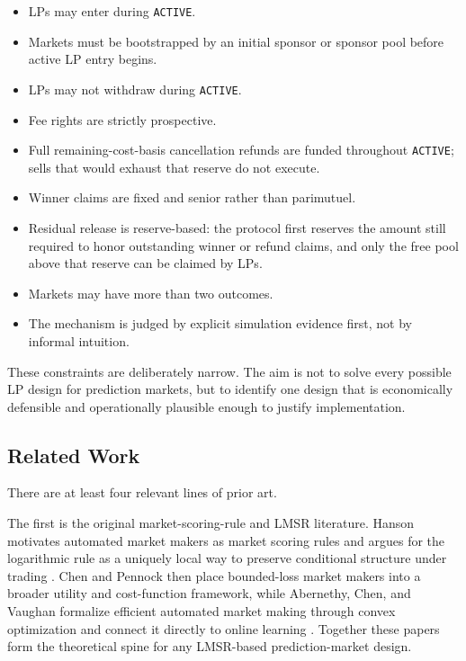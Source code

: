 \documentclass[10pt]{article}
\begin{document}
\begin{itemize}
\item LPs may enter during \texttt{ACTIVE}.
\item Markets must be bootstrapped by an initial sponsor or sponsor pool before active LP entry begins.
\item LPs may not withdraw during \texttt{ACTIVE}.
\item Fee rights are strictly prospective.
\item Full remaining-cost-basis cancellation refunds are funded throughout \texttt{ACTIVE}; sells that would exhaust that reserve do not execute.
\item Winner claims are fixed and senior rather than parimutuel.
\item Residual release is reserve-based: the protocol first reserves the amount still required to honor outstanding winner or refund claims, and only the free pool above that reserve can be claimed by LPs.
\item Markets may have more than two outcomes.
\item The mechanism is judged by explicit simulation evidence first, not by informal intuition.
\end{itemize}

These constraints are deliberately narrow. The aim is not to solve every possible LP design for prediction markets, but to identify one design that is economically defensible and operationally plausible enough to justify implementation.

\subsection{Related Work}

There are at least four relevant lines of prior art.

The first is the original market-scoring-rule and LMSR literature. Hanson motivates automated market makers as market scoring rules and argues for the logarithmic rule as a uniquely local way to preserve conditional structure under trading \cite{hanson2002}. Chen and Pennock then place bounded-loss market makers into a broader utility and cost-function framework, while Abernethy, Chen, and Vaughan formalize efficient automated market making through convex optimization and connect it directly to online learning \cite{chenpennock2007,abernethychenvaughan2013}. Together these papers form the theoretical spine for any LMSR-based prediction-market design.
\end{document}
